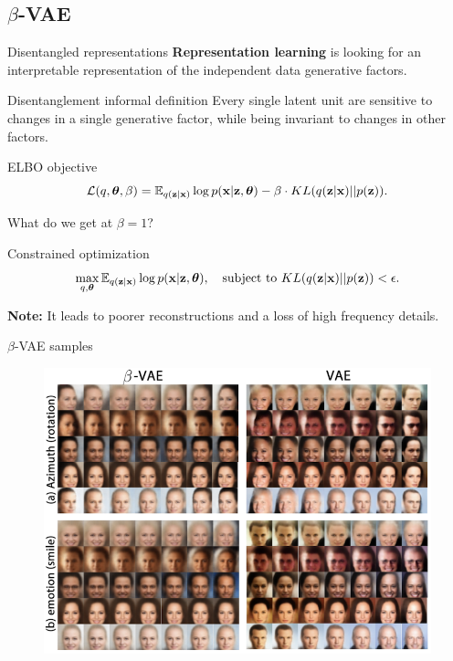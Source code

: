 \subsection{$\beta$-VAE}
\begin{frame}{Disentangled representations}
	\vspace{-0.2cm}
	\textbf{Representation learning} is looking for an interpretable representation of the independent data generative factors. 
	\begin{block}{Disentanglement informal definition}
		Every single latent unit are sensitive to changes in a single generative factor, while being invariant to changes in other factors. 
	\end{block}
	\vspace{-0.2cm}
	\begin{block}{ELBO objective}
		\vspace{-0.2cm}
		\[
		\mathcal{L}(q, \boldsymbol{\theta}, \beta) = \mathbb{E}_{q(\mathbf{z} | \mathbf{x})} \log p(\mathbf{x} | \mathbf{z}, \boldsymbol{\theta}) - \beta \cdot KL (q(\mathbf{z} | \mathbf{x}) || p(\mathbf{z})).
		\]
		\vspace{-0.5cm}
	\end{block}
	What do we get at $\beta = 1$? \\
	\begin{block}{Constrained optimization}
		\vspace{-0.7cm}
		\[
		\max_{q, \boldsymbol{\theta}} \mathbb{E}_{q(\mathbf{z} | \mathbf{x})} \log p(\mathbf{x} | \mathbf{z}, \boldsymbol{\theta}), \quad \text{subject to } KL (q(\mathbf{z} | \mathbf{x}) || p(\mathbf{z})) < \epsilon.
		\]
		\vspace{-0.7cm}
	\end{block}
	\textbf{Note:} It leads to poorer reconstructions and a loss of high frequency details. 
\end{frame}
\begin{frame}{$\beta$-VAE samples}
	\begin{figure}
		\centering
		\includegraphics[width=0.9\linewidth]{figs/betaVAE_1.png}
	\end{figure}
	
\end{frame}
